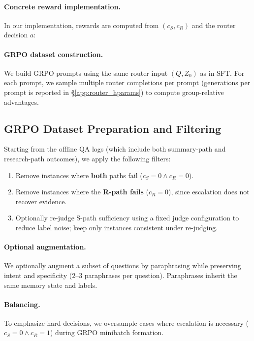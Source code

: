\documentclass{article}
\theoremstyle{plain}
\theoremstyle{definition}
\theoremstyle{remark}
\begin{document}
\paragraph{Concrete reward implementation.}
In our implementation, rewards are computed from $(c_S, c_R)$ and the router decision $a$:

\paragraph{GRPO dataset construction.}
We build GRPO prompts using the same router input $(Q, Z_0)$ as in SFT. For each prompt, we sample multiple router completions per prompt (generations per prompt is reported in \S\ref{app:router_hparams}) to compute group-relative advantages.

\subsection{GRPO Dataset Preparation and Filtering}
\label{app:router_grpo_data}

Starting from the offline QA logs (which include both summary-path and research-path outcomes), we apply the following filters:
\begin{enumerate}
  \item Remove instances where \textbf{both} paths fail ($c_S=0 \land c_R=0$).
  \item Remove instances where the \textbf{R-path fails} ($c_R=0$), since escalation does not recover evidence.
  \item Optionally re-judge S-path sufficiency using a fixed judge configuration to reduce label noise; keep only instances consistent under re-judging.
\end{enumerate}

\paragraph{Optional augmentation.}
We optionally augment a subset of questions by paraphrasing while preserving intent and specificity (2--3 paraphrases per question). Paraphrases inherit the same memory state and labels.

\paragraph{Balancing.}
To emphasize hard decisions, we oversample cases where escalation is necessary ($c_S=0 \land c_R=1$) during GRPO minibatch formation.
\end{document}

